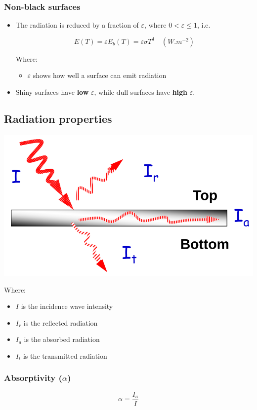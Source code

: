 \documentclass[11pt]{article}
\begin{document}
\subsubsection{Non-black surfaces}
\label{sec:org63bd62b}
\begin{itemize}
\item The radiation is reduced by a fraction of \(\varepsilon\), where \(0 < \varepsilon \le 1\), i.e.

\[E(T) = \varepsilon E_b (T) = \varepsilon \sigma T^4 \quad (\unit{W.m^{-2}})\]

Where:
\begin{itemize}
\item \(\varepsilon\) shows how well a surface can emit radiation
\end{itemize}
\item Shiny surfaces have \textbf{low} \(\varepsilon\), while dull surfaces have \textbf{high} \(\varepsilon\).
\end{itemize}
\subsection{Radiation properties}
\label{sec:org301e9f4}
\begin{center}
\includegraphics[width=.9\linewidth]{./images/radiation-properties.png}
\end{center}

Where:
\begin{itemize}
\item \(I\) is the incidence wave intensity
\item \(I_r\) is the reflected radiation
\item \(I_a\) is the absorbed radiation
\item \(I_t\) is the transmitted radiation
\end{itemize}
\subsubsection{Absorptivity (\(\alpha\))}
\label{sec:org819e9c4}
\[\alpha = \frac{I_a}{I}\]
\end{document}
